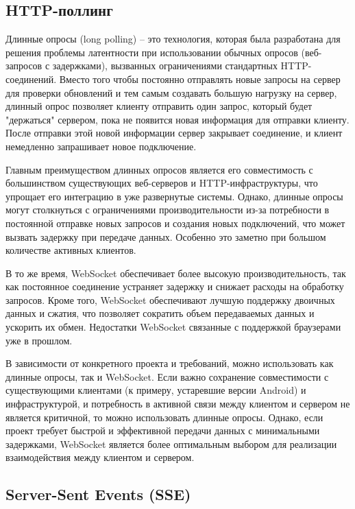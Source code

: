 \subsection{HTTP-поллинг}


Длинные опросы (long polling) -- это технология, которая была разработана для решения проблемы латентности при использовании обычных опросов (веб-запросов с задержками), вызванных ограничениями стандартных HTTP-соединений. Вместо того чтобы постоянно отправлять новые запросы на сервер для проверки обновлений и тем самым создавать большую нагрузку на сервер, длинный опрос позволяет клиенту отправить один запрос, который будет "держаться" сервером, пока не появится новая информация для отправки клиенту. После отправки этой новой информации сервер закрывает соединение, и клиент немедленно запрашивает новое подключение.

Главным преимуществом длинных опросов является его совместимость с большинством существующих веб-серверов и HTTP-инфраструктуры, что упрощает его интеграцию в уже развернутые системы. Однако, длинные опросы могут столкнуться с ограничениями производительности из-за потребности в постоянной отправке новых запросов и создания новых подключений, что может вызвать задержку при передаче данных. Особенно это заметно при большом количестве активных клиентов.

В то же время, WebSocket обеспечивает более высокую производительность, так как постоянное соединение устраняет задержку и снижает расходы на обработку запросов. Кроме того, WebSocket обеспечивают лучшую поддержку двоичных данных и сжатия, что позволяет сократить объем передаваемых данных и ускорить их обмен. Недостатки WebSocket связанные с поддержкой браузерами уже в прошлом.

В зависимости от конкретного проекта и требований, можно использовать как длинные опросы, так и WebSocket. Если важно сохранение совместимости с существующими клиентами (к примеру, устаревшие версии Android) и инфраструктурой, и потребность в активной связи между клиентом и сервером не является критичной, то можно использовать длинные опросы. Однако, если проект требует быстрой и эффективной передачи данных с минимальными задержками, WebSocket является более оптимальным выбором для реализации взаимодействия между клиентом и сервером.

\subsection{Server-Sent Events (SSE)}

